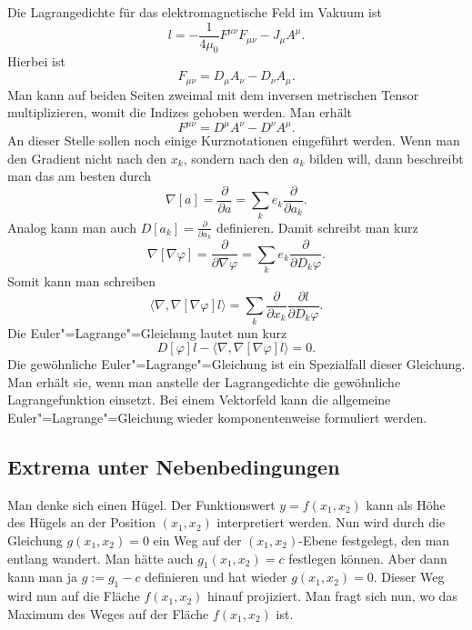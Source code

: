 \documentclass[a4paper,11pt,fleqn,twocolumn,twoside]{scrartcl}
\numberwithin{equation}{section}
\begin{document}
Die Lagrangedichte für das elektromagnetische Feld im Vakuum ist
\begin{equation}
l = -\frac{1}{4\mu_0} F^{\mu\nu}F_{\mu\nu} -J_\mu A^\mu.
\end{equation}
Hierbei ist
\begin{equation}
F_{\mu\nu} = D_\mu A_\nu - D_\nu A_\mu.
\end{equation}
Man kann auf beiden Seiten zweimal mit dem inversen metrischen
Tensor multiplizieren, womit die Indizes gehoben werden. Man erhält
\begin{equation}
F^{\mu\nu} = D^\mu A^\nu - D^\nu A^\mu.
\end{equation}
An dieser Stelle sollen noch einige Kurznotationen eingeführt werden.
Wenn man den Gradient nicht nach den $x_k$, sondern nach
den $a_k$ bilden will, dann beschreibt man das am besten durch
\begin{equation}
\nabla[a] = \frac{\partial}{\partial a}
= \sum_k e_k\frac{\partial}{\partial a_k}.
\end{equation}
Analog kann man auch $D[a_k]=\frac{\partial}{\partial a_k}$
definieren.
Damit schreibt man kurz
\begin{equation}
\nabla[\nabla\varphi] = \frac{\partial}{\partial\nabla\varphi}
= \sum_k e_k\frac{\partial}{\partial D_k\varphi}.
\end{equation}
Somit kann man schreiben
\begin{equation}
\langle\nabla,\nabla[\nabla\varphi]l\rangle
= \sum_k \frac{\partial}{\partial x_k}
\frac{\partial l}{\partial D_k\varphi}.
\end{equation}
Die Euler"=Lagrange"=Gleichung lautet nun kurz
\begin{equation}
D[\varphi]l-\langle\nabla,\nabla[\nabla\varphi]l\rangle=0.
\end{equation}
Die gewöhnliche Euler"=Lagrange"=Gleichung ist ein Spezialfall dieser
Gleichung. Man erhält sie, wenn man anstelle der Lagrangedichte
die gewöhnliche Lagrangefunktion einsetzt. Bei einem Vektorfeld
kann die allgemeine Euler"=Lagrange"=Gleichung wieder komponentenweise
formuliert werden.

\subsection{Extrema unter Nebenbedingungen}

Man denke sich einen Hügel. Der Funktionswert $y=f(x_1,x_2)$ kann
als Höhe des Hügels an der Position $(x_1,x_2)$ interpretiert
werden. Nun wird durch die Gleichung $g(x_1,x_2)=0$ ein Weg auf der
$(x_1,x_2)$-Ebene festgelegt, den man entlang wandert.
Man hätte auch $g_1(x_1,x_2)=c$
festlegen können. Aber dann kann man ja $g:=g_1-c$ definieren und
hat wieder $g(x_1,x_2)=0$. Dieser Weg wird nun auf die Fläche
$f(x_1,x_2)$ hinauf projiziert. Man fragt sich nun, wo das Maximum
des Weges auf der Fläche $f(x_1,x_2)$ ist.
\end{document}
